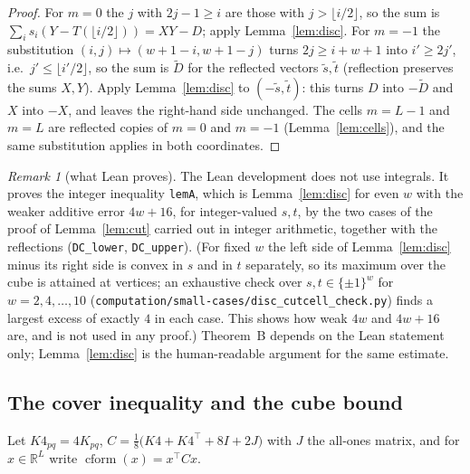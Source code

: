 \documentclass[11pt]{amsart}
\theoremstyle{remark}
\newtheorem{remark}[theorem]{Remark}
\newcommand{\R}{\mathbb{R}}
\begin{document}
\begin{proof}
For $m=0$ the $j$ with $2j-1\ge i$ are those with $j>\lfloor i/2\rfloor$, so the sum is $\sum_is_i(Y-T(\lfloor i/2\rfloor))=XY-D$; apply Lemma~\ref{lem:disc}. For $m=-1$ the substitution $(i,j)\mapsto(w+1-i,w+1-j)$ turns $2j\ge i+w+1$ into $i'\ge2j'$, i.e.\ $j'\le\lfloor i'/2\rfloor$,
so the sum is $\tilde D$ for the reflected vectors $\tilde s,\tilde t$ (reflection preserves the sums $X,Y$). Apply Lemma~\ref{lem:disc} to $(-\tilde s,\tilde t)$: this turns $D$ into $-\tilde D$ and $X$ into $-X$, and leaves the right-hand side unchanged.
The cells $m=L-1$ and $m=L$ are reflected copies of $m=0$ and $m=-1$ (Lemma~\ref{lem:cells}), and the same substitution applies in both coordinates.
\end{proof}
\begin{remark}[what Lean proves]\label{rem:discrete}
The Lean development does not use integrals. It proves the integer inequality \texttt{lemA}, which is Lemma~\ref{lem:disc} for even $w$ with the weaker additive error $4w+16$, for integer-valued $s,t$, by the two cases of the proof of Lemma~\ref{lem:cut} carried out in integer arithmetic, together with the reflections (\texttt{DC\_lower}, \texttt{DC\_upper}).
(For fixed $w$ the left side of Lemma~\ref{lem:disc} minus its right side is convex in $s$ and in $t$ separately, so its maximum over the cube is attained at vertices; an exhaustive check over $s,t\in\{\pm1\}^w$ for $w=2,4,\dots,10$ (\texttt{computation/small-cases/disc\_cutcell\_check.py}) finds a largest excess of exactly $4$ in each case. This shows how weak $4w$ and $4w+16$ are, and is not used in any proof.)
Theorem~B depends on the Lean statement only; Lemma~\ref{lem:disc} is the human-readable argument for the same estimate.
\end{remark}

\subsection{The cover inequality and the cube bound}
Let $K4_{pq}=4K_{pq}$, $C=\tfrac18\bigl(K4+K4^{\top}+8I+2J\bigr)$ with $J$ the all-ones matrix, and for $x\in\R^L$ write $\operatorname{cform}(x)=x^{\top}Cx$.
\end{document}
